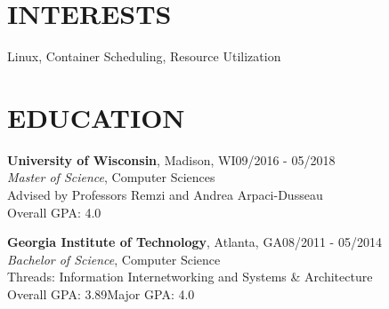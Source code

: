 \documentclass[margin,11pt]{res}
\begin{document}


\address{US Citizen}
\address{dennis@kernel.org $\bullet$ 651-442-8757}


\begin{resume}
\section{INTERESTS}
Linux, Container Scheduling, Resource Utilization


\section{EDUCATION}
\textbf{University of Wisconsin}, Madison, WI\hfill 09/2016 - 05/2018\\
{\sl Master of Science}, Computer Sciences\\
Advised by Professors Remzi and Andrea Arpaci-Dusseau\\
Overall GPA: 4.0

\textbf{Georgia Institute of Technology}, Atlanta, GA\hfill 08/2011 - 05/2014\\
{\sl Bachelor of Science}, Computer Science\\
Threads: Information Internetworking and Systems \& Architecture\\
Overall GPA: 3.89\hspace{10mm}Major GPA: 4.0


\end{resume}
\end{document}
